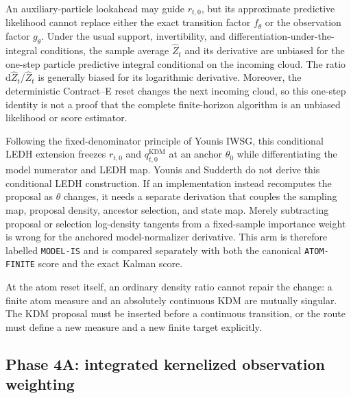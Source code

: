\documentclass[11pt]{article}
\newcommand{\dd}{\mathrm{d}}
\newcommand{\KDM}{\ensuremath{\mathrm{KDM}}}
\begin{document}
An auxiliary-particle lookahead may guide $r_{t,0}$, but its approximate
predictive likelihood cannot replace either the exact transition factor
$f_\theta$ or the observation factor $g_\theta$.  Under the usual support,
invertibility, and differentiation-under-the-integral conditions, the sample
average $\widehat Z_t$ and its derivative are unbiased for the one-step
particle predictive integral conditional on the incoming cloud.  The ratio
$\dd\widehat Z_t/\widehat Z_t$ is generally biased for its logarithmic
derivative.  Moreover, the deterministic Contract--E reset changes the next
incoming cloud, so this one-step identity is not a proof that the complete
finite-horizon algorithm is an unbiased likelihood or score estimator.

Following the fixed-denominator principle of Younis IWSG, this conditional
LEDH extension freezes $r_{t,0}$ and $q^{\KDM}_{t,0}$ at an anchor $\theta_0$ while
differentiating the model numerator and LEDH map.  Younis and Sudderth do not
derive this conditional LEDH construction.  If an implementation instead
recomputes the proposal as $\theta$ changes, it needs a separate derivation
that couples the sampling map, proposal density, ancestor selection, and state
map.  Merely subtracting proposal or selection log-density tangents from a
fixed-sample importance weight is wrong for the anchored model-normalizer
derivative.  This arm is therefore labelled
\texttt{MODEL-IS} and is compared separately with both the canonical
\texttt{ATOM-FINITE} score and the exact Kalman score.

At the atom reset itself, an ordinary density ratio cannot repair the change:
a finite atom measure and an absolutely continuous KDM are mutually singular.
The KDM proposal must be inserted before a continuous transition, or the route
must define a new measure and a new finite target explicitly.

\subsection{Phase 4A: integrated kernelized observation weighting}
\end{document}
